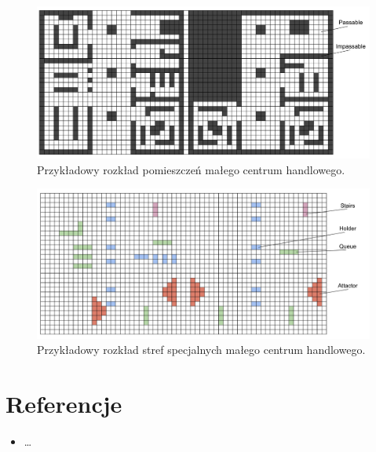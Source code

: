 \documentclass[a4paper, 12pt]{article}
\begin{document}
        \begin{figure}[h!]
            \centering
            \includegraphics[scale=0.2]{./img/MallLayout.pdf}
            \caption{Przykładowy rozkład pomieszczeń małego centrum handlowego.}
            \label{fig:mall-layout}
        \end{figure}

        \begin{figure}[h!]
            \centering
            \includegraphics[scale=0.2]{./img/MallFeatures.pdf}
            \caption{Przykładowy rozkład stref specjalnych małego centrum handlowego.}
            \label{fig:mall-features}
        \end{figure}


\newpage
    \section{Referencje}
    \label{sec:refs}

    \begin{itemize}
        \begin{item} \label{refs:social-distances-1} Social Distances \end{item}
        \item \ldots %
    \end{itemize}
\end{document}
